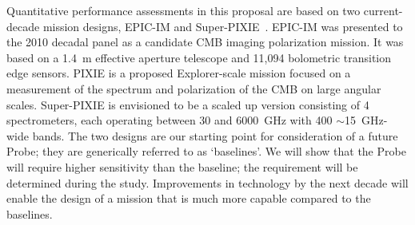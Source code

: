 Quantitative performance assessments in this proposal are based on two current-decade mission designs, 
EPIC-IM and Super-PIXIE~\cite{bock2009, Kogut2011PIXIE}. 
EPIC-IM was presented to the 2010 decadal panel as a candidate \ac{CMB} imaging polarization mission. 
It was based on a 1.4~m effective aperture telescope and 11,094 bolometric transition edge sensors. 
PIXIE is a proposed Explorer-scale mission focused on a measurement of the spectrum 
and polarization of the CMB on large angular scales. Super-PIXIE is envisioned to be a scaled up
version consisting of 4 spectrometers, each operating between 
30 and 6000~GHz with 400 $\sim$15~GHz-wide bands. The two designs are our starting point
for consideration of a future Probe; they are generically referred to as `baselines'. 
We will show that the Probe will require higher sensitivity than the baseline; the requirement
will be determined during the study. Improvements in technology by the next decade will enable 
the design of a mission that is much more capable compared to the baselines. 


